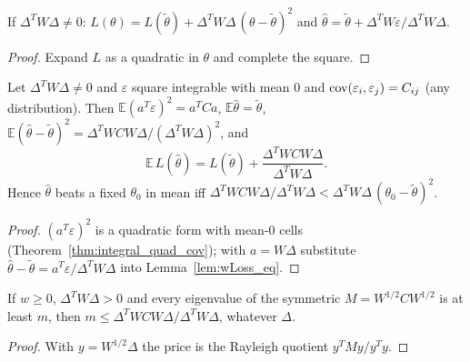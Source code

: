 \begin{lemma}\label{lem:wLoss_eq}
  \leanok
  If $\Delta^TW\Delta \ne 0$: $L(\theta) = L(\tilde\theta) + \Delta^TW\Delta\,(\theta - \tilde\theta)^2$ and
  $\hat\theta = \tilde\theta + \Delta^TW\varepsilon/\Delta^TW\Delta$.
\end{lemma}
\begin{proof}
  \leanok
  Expand $L$ as a quadratic in $\theta$ and complete the square.
\end{proof}

\begin{theorem}\label{thm:heldOut_price}
  \leanok
  Let $\Delta^TW\Delta \ne 0$ and $\varepsilon$ square integrable with mean $0$ and
  $\operatorname{cov}(\varepsilon_i, \varepsilon_j) = C_{ij}$ (any distribution). Then
  $\mathbb E(a^T\varepsilon)^2 = a^TCa$, $\mathbb E\hat\theta = \tilde\theta$,
  $\mathbb E(\hat\theta - \tilde\theta)^2 = \Delta^TWCW\Delta/(\Delta^TW\Delta)^2$, and
  \[
    \mathbb E\,L(\hat\theta) = L(\tilde\theta) + \frac{\Delta^TWCW\Delta}{\Delta^TW\Delta}.
  \]
  Hence $\hat\theta$ beats a fixed $\theta_0$ in mean iff
  $\Delta^TWCW\Delta/\Delta^TW\Delta < \Delta^TW\Delta\,(\theta_0 - \tilde\theta)^2$.
\end{theorem}
\begin{proof}
  \leanok
  $(a^T\varepsilon)^2$ is a quadratic form with mean-$0$ cells
  (Theorem~\ref{thm:integral_quad_cov}); with $a = W\Delta$ substitute
  $\hat\theta - \tilde\theta = a^T\varepsilon/\Delta^TW\Delta$ into Lemma~\ref{lem:wLoss_eq}.
\end{proof}

\begin{theorem}\label{thm:heldOut_price_ge}
  \leanok
  If $w \ge 0$, $\Delta^TW\Delta > 0$ and every eigenvalue of the symmetric
  $M = W^{1/2}CW^{1/2}$ is at least $m$, then $m \le \Delta^TWCW\Delta/\Delta^TW\Delta$, whatever $\Delta$.
\end{theorem}
\begin{proof}
  \leanok
  With $y = W^{1/2}\Delta$ the price is the Rayleigh quotient $y^TMy/y^Ty$.
\end{proof}

